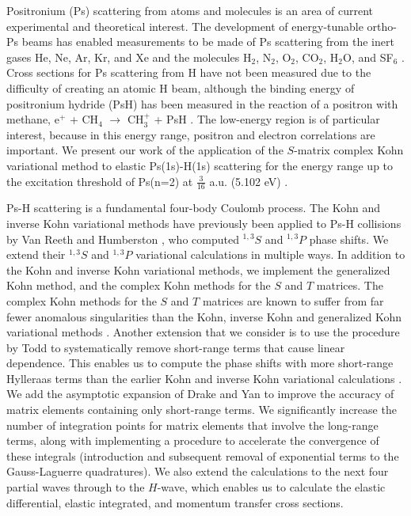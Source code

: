 \documentclass[preprint,showpacs,showkeys,preprintnumbers,amsmath,amssymb,longbibliography,pra,aps]{revtex4-1}
\begin{document}
Positronium (Ps) scattering from atoms and molecules is an area of current 
experimental and theoretical interest. The development of energy-tunable
ortho-Ps beams
\cite{Brown1985,Laricchia1987,Zafar1996,Garner1996,Laricchia2008} 
has enabled measurements to be made of Ps scattering from the inert gases He,
Ne, Ar, Kr, and Xe
\cite{Garner1996,Garner2000,Armitage2002,Laricchia2004,Armitage2006,Laricchia2008,Engbrecht2008,Brawley2010a}
and the molecules H$_2$, N$_2$, O$_2$, CO$_2$, H$_2$O, and SF$_6$
\cite{Garner1996,Garner1998,Garner2000,Laricchia2004,Armitage2006,Beale2006,Brawley2010a}.
Cross sections for Ps scattering from H have not been measured due to the
difficulty of creating an atomic H beam, although the binding energy of
positronium hydride (PsH) has been measured in the reaction of a positron with
methane, e$^+$ + CH$_4$ $\to$ CH$_3^+$ + PsH \cite{Schrader1992}. The low-energy
region is of particular interest, because in this energy range, positron and
electron correlations are important. We present our work of the application
of the $S$-matrix complex Kohn variational 
method to elastic Ps(1s)-H(1s) scattering for the energy range
up to the excitation threshold of Ps(n=2) at $\tfrac{3}{16}$ a.u.
(5.102 eV) \cite{Conferences1,Conferences2,Conferences3,WoodsDiss2015}.

Ps-H scattering is a fundamental four-body Coulomb process. The Kohn and 
inverse Kohn variational methods have previously been applied to Ps-H 
collisions by Van Reeth and Humberston \cite{VanReeth2003,VanReeth2004}, who 
computed $^{1,3}S$ and $^{1,3}P$ phase shifts. We 
extend their $^{1,3}S$ and $^{1,3}P$  variational calculations in 
multiple ways. In addition to
the Kohn and inverse Kohn variational methods, we implement the 
generalized Kohn method, and the complex Kohn methods for the $S$ and $T$ matrices.
The complex Kohn methods for the $S$ and $T$ matrices
are known to suffer from far fewer anomalous singularities than the Kohn,
inverse Kohn and generalized Kohn variational methods
\cite{Lucchese1989, Cooper2009, Cooper2010}. Another extension that we
consider is to use the procedure by Todd 
\cite{Todd2007} to systematically remove short-range terms that cause linear 
dependence. This enables us to compute the phase shifts
with more short-range Hylleraas terms than the earlier 
Kohn and inverse Kohn variational calculations
\cite{VanReeth2003, VanReeth2004}.
We add the asymptotic expansion of Drake and Yan
\cite{Drake1995, Yan1997} to improve the accuracy of matrix elements
containing only short-range terms. We significantly increase
the number of integration points for matrix
elements that involve the long-range terms, along with implementing a
procedure to
accelerate the convergence of these integrals (introduction
and subsequent removal of exponential terms to the Gauss-Laguerre
quadratures). We also extend the 
calculations to the next four partial waves through to the $H$-wave, which
enables us to calculate the elastic differential, elastic integrated,
and momentum transfer cross sections.
\end{document}
